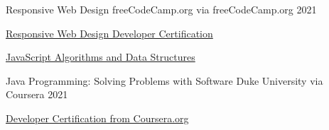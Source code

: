 

\begin{cventries}



    \cventry
        {Responsive Web Design} %
        {freeCodeCamp.org}
        {via freeCodeCamp.org} %
        {2021} %
        {
            \begin{cvitems} %
            \item {
                \href{https://www.freecodecamp.org/certification/sife-ops/responsive-web-design}
                {Responsive Web Design Developer Certification \faExternalLink}
            }
            \item {
                \href{https://www.freecodecamp.org/certification/sife-ops/javascript-algorithms-and-data-structures}
                {JavaScript Algorithms and Data Structures \faExternalLink}
            }
            \end{cvitems}
        }

    \cventry
        {Java Programming: Solving Problems with Software} %
        {Duke University}
        {via Coursera} %
        {2021} %
        {
            \begin{cvitems} %
            \item {
                \href{https://coursera.org/share/cc17d0c09d2c0be6d564e4f28b7cf2d9}
                {Developer Certification from Coursera.org \faExternalLink}
            }
            \end{cvitems}
        }


\end{cventries}
